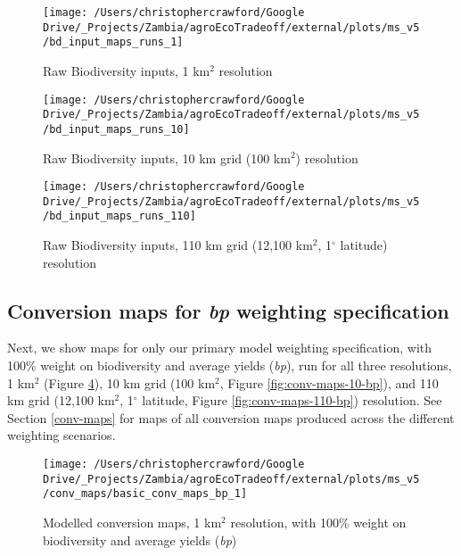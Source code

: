 \documentclass[
]{article}
\begin{document}
\begin{figure}
\texttt{[image: /Users/christophercrawford/Google Drive/\_Projects/Zambia/agroEcoTradeoff/external/plots/ms\_v5/bd\_input\_maps\_runs\_1]} \caption{Raw Biodiversity inputs, 1 km\(^2\) resolution}\label{fig:bd-inputs-1}
\end{figure}

\begin{figure}
\texttt{[image: /Users/christophercrawford/Google Drive/\_Projects/Zambia/agroEcoTradeoff/external/plots/ms\_v5/bd\_input\_maps\_runs\_10]} \caption{Raw Biodiversity inputs, 10 km grid (100 km\(^2\)) resolution}\label{fig:bd-inputs-10}
\end{figure}

\begin{figure}
\texttt{[image: /Users/christophercrawford/Google Drive/\_Projects/Zambia/agroEcoTradeoff/external/plots/ms\_v5/bd\_input\_maps\_runs\_110]} \caption{Raw Biodiversity inputs, 110 km grid (12,100 km\(^2\), 1\(^{\circ}\) latitude) resolution}\label{fig:bd-inputs-110}
\end{figure}

\hypertarget{conversion-maps-for-bp-weighting-specification}{%
\subsection{\texorpdfstring{Conversion maps for \emph{bp} weighting specification}{Conversion maps for bp weighting specification}}\label{conversion-maps-for-bp-weighting-specification}}

Next, we show maps for only our primary model weighting specification, with 100\% weight on biodiversity and average yields (\emph{bp}), run for all three resolutions, 1 km\(^2\) (Figure \ref{fig:conv-maps-1-bp}), 10 km grid (100 km\(^2\), Figure \ref{fig:conv-maps-10-bp}), and 110 km grid (12,100 km\(^2\), 1\(^{\circ}\) latitude, Figure \ref{fig:conv-maps-110-bp}) resolution. See Section \ref{conv-maps} for maps of all conversion maps produced across the different weighting scenarios.





\begin{figure}
\texttt{[image: /Users/christophercrawford/Google Drive/\_Projects/Zambia/agroEcoTradeoff/external/plots/ms\_v5/conv\_maps/basic\_conv\_maps\_bp\_1]} \caption{Modelled conversion maps, 1 km\(^2\) resolution, with 100\% weight on biodiversity and average yields (\emph{bp})}\label{fig:conv-maps-1-bp}
\end{figure}
\end{document}
